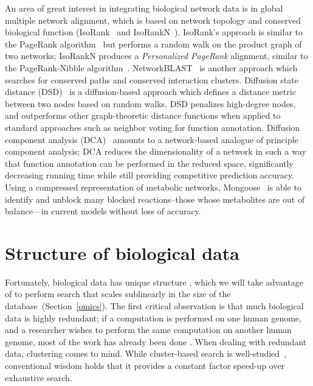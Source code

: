 \documentclass{acm_proc_article-sp}
\begin{document}
An area of great interest in integrating biological network data is in global multiple network 
alignment, which is based on network topology and conserved biological function (IsoRank~\cite{singh2008global} and IsoRankN~\cite{liao2009isorankn}).
IsoRank's approach is similar to the PageRank algorithm~\cite{berger2013computational} 
but performs a random walk on the product graph of two networks;
IsoRankN produces a \emph{Personalized PageRank} alignment, similar to the
PageRank-Nibble algorithm~\cite{berger2013computational}.
NetworkBLAST~\cite{atias2012comparative} is another approach which searches for 
conserved paths and conserved interaction clusters.
Diffusion state distance (DSD)~\cite{cao2013going} is a diffusion-based approach
which defines a distance metric between two nodes based on random walks.
DSD penalizes high-degree nodes, and outperforms other graph-theoretic distance
functions when applied to standard approaches such as neighbor voting for function annotation.
Diffusion component analysis (DCA)~\cite{cho2015diffusion} amounts to a network-based 
analogue of principle component analysis; DCA reduces the dimensionality of a
network in such a way that function annotation can be performed in the reduced 
space, significantly decreasing running time while still providing competitive
prediction accuracy.
Using a compressed representation of metabolic networks, 
Mongoose~\cite{chindelevitch2014exact} is able to 
identify and unblock many blocked reactions--those whose metabolites are out of 
balance---in current models without loss of accuracy.


\section{Structure of biological data}\label{structure}

Fortunately, biological data has unique structure \cite{yu2015entropy}, which we 
will take advantage of to perform search that scales sublinearly in the size of the database~(Section~\ref{omics}).
The first critical observation is that
much biological data is highly redundant; if a computation is performed on one
human genome, and a researcher wishes to perform the same computation on another
human genome, most of the work has already been done \cite{loh2012compressive}.
When dealing with redundant data, clustering comes to mind.
While cluster-based search is well-studied~\cite{jardine1971use}, conventional
wisdom holds that it provides a constant factor speed-up over exhaustive search.
\end{document}
